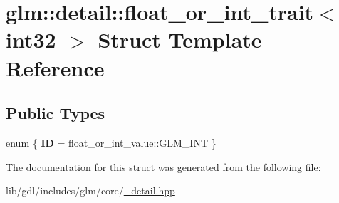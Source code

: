 \hypertarget{structglm_1_1detail_1_1float__or__int__trait_3_01int32_01_4}{}\section{glm\+:\+:detail\+:\+:float\+\_\+or\+\_\+int\+\_\+trait$<$ int32 $>$ Struct Template Reference}
\label{structglm_1_1detail_1_1float__or__int__trait_3_01int32_01_4}
\subsection*{Public Types}
\begin{DoxyCompactItemize}
\item 
\hypertarget{structglm_1_1detail_1_1float__or__int__trait_3_01int32_01_4_abe294da381d46510a66f7a512797fc93}{}enum \{ {\bfseries I\+D} = float\+\_\+or\+\_\+int\+\_\+value\+:\+:G\+L\+M\+\_\+\+I\+N\+T
 \}\label{structglm_1_1detail_1_1float__or__int__trait_3_01int32_01_4_abe294da381d46510a66f7a512797fc93}

\end{DoxyCompactItemize}


The documentation for this struct was generated from the following file\+:\begin{DoxyCompactItemize}
\item 
lib/gdl/includes/glm/core/\hyperlink{__detail_8hpp}{\+\_\+detail.\+hpp}\end{DoxyCompactItemize}
